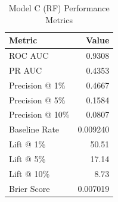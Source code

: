 \begin{table}[h]
\centering
\begin{tabular}{lr}
\toprule
Metric & Value \\
\midrule
ROC AUC & 0.9308 \\
PR AUC & 0.4353 \\
Precision @ 1\% & 0.4667 \\
Precision @ 5\% & 0.1584 \\
Precision @ 10\% & 0.0807 \\
Baseline Rate & 0.009240 \\
Lift @ 1\% & 50.51 \\
Lift @ 5\% & 17.14 \\
Lift @ 10\% & 8.73 \\
Brier Score & 0.007019 \\
\bottomrule
\end{tabular}
\caption{Model C (RF) Performance Metrics}
\label{tab:modelc_rf_metrics}
\end{table}
